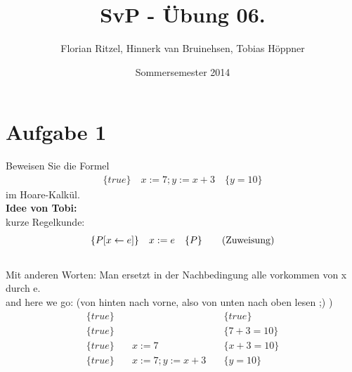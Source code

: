 \documentclass[ngerman,a4paper]{report}
\author{Florian Ritzel, Hinnerk van Bruinehsen, Tobias Höppner}
\title{SvP - Übung 06. }
\date{Sommersemester 2014}
\renewcommand{\maketitle}{}
\begin{document}
\maketitle
\section*{Aufgabe 1}
Beweisen Sie die Formel
\begin{align*}
\{true\}\quad
x:=7;y:=x+3\quad
\{y=10\}
\end{align*}
im Hoare-Kalkül.\\
\textbf{Idee von Tobi:}\\
kurze Regelkunde:
\begin{align}
\{P[x\leftarrow e]	\}\quad	x:=e 	\quad						\{P\}\tag{Zuweisung}\\
\notag
\end{align}
Mit anderen Worten: Man ersetzt in der Nachbedingung alle vorkommen von x durch e.\\
and here we go: (von hinten nach vorne, also von unten nach oben lesen ;) )
\begin{align*}
\{true\}\quad & 			\quad &\{true\} \\
\{true\}\quad &			\quad &\{7+3=10\} \tag{Zuweisung}\\
\{true\}\quad &	x:=7		\quad &\{x+3=10\} \tag{Zuweisung}\\
\{true\}\quad &	x:=7;y:=x+3		\quad &\{y=10\}\\
\end{align*}
\end{document}
